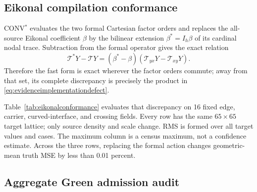 \documentclass[journal]{IEEEtran}
\newcommand{\Tcal}{\mathcal{T}}
\begin{document}
\subsection{Eikonal compilation conformance}

CONV$^{*}$ evaluates the two formal Cartesian factor orders and replaces the
all-source Eikonal coefficient \(\beta\) by the bilinear extension
\(\beta^*=I_h\beta\) of its cardinal nodal trace. Subtraction from the formal
operator gives the exact relation
\begin{equation}
 \Tcal^*Y-\Tcal Y
 = (\beta^*-\beta)(\Tcal_{yx}Y-\Tcal_{xy}Y).
 \label{eq:evidenceimplementationdefect}
\end{equation}
Therefore the fast form is exact wherever the factor orders commute; away
from that set, its complete discrepancy is precisely the product in
\eqref{eq:evidenceimplementationdefect}.

Table~\ref{tab:eikonalconformance} evaluates that discrepancy on 16 fixed
edge, carrier, curved-interface, and crossing fields. Every row has the same
$65\times65$ target lattice; only source density and scale change. RMS is
formed over all target values and cases. The maximum column is a census
maximum, not a confidence estimate. Across the three rows, replacing the
formal action changes geometric-mean truth MSE by less than 0.01 percent.

\begin{table}[H]
\caption{CONV$^{*}$ conformance to formal Eikonal CONV at target side 65}
\label{tab:eikonalconformance}
\centering
\scriptsize
\setlength{\tabcolsep}{2.5pt}
\end{table}

\subsection{Aggregate Green admission audit}
\end{document}
